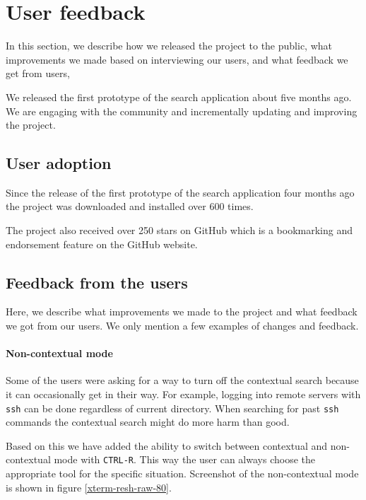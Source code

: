 
\section{User feedback}

In this section, we describe how we released the project to the public, what improvements we made based on interviewing our users, and what feedback we get from users,

We released the first prototype of the search application about five months ago. We are engaging with the community and incrementally updating and improving the project. 

\subsection{User adoption}

Since the release of the first prototype of the search application four months ago the project was downloaded and installed over 600 times. 

The project also received over 250 stars on GitHub which is a bookmarking and endorsement feature on the GitHub website.\cite{github-stars}



\subsection{Feedback from the users}

Here, we describe what improvements we made to the project and what feedback we got from our users. We only mention a few examples of changes and feedback.

\paragraph{Non-contextual mode}

Some of the users were asking for a way to turn off the contextual search because it can occasionally get in their way. For example, logging into remote servers with \verb|ssh| can be done regardless of current directory. When searching for past \verb|ssh| commands the contextual search might do more harm than good.

Based on this we have added the ability to switch between contextual and non-contextual mode with \verb|CTRL-R|. This way the user can always choose the appropriate tool for the specific situation. Screenshot of the non-contextual mode is shown in figure \ref{xterm-resh-raw-80}.

